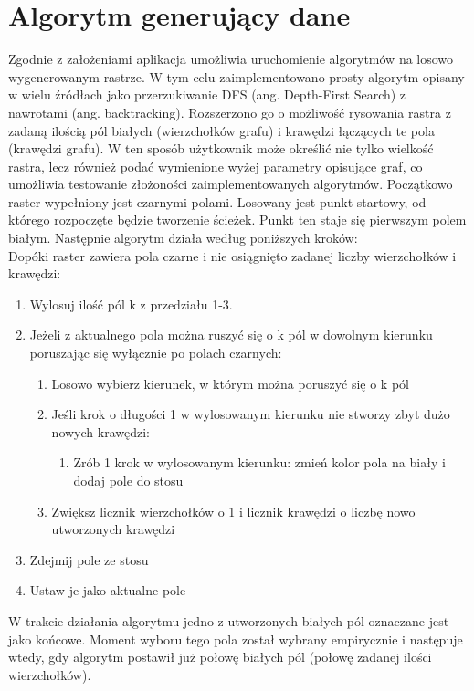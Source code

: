 \documentclass[11pt,a4paper]{article}
\begin{document}
\section{Algorytm generujący dane}
Zgodnie z założeniami aplikacja umożliwia uruchomienie algorytmów na losowo wygenerowanym
rastrze. W tym celu zaimplementowano prosty algorytm opisany w wielu źródłach jako
przerzukiwanie DFS (ang. Depth-First Search) z nawrotami (ang. backtracking). Rozszerzono
go o możliwość rysowania rastra z zadaną ilością pól białych (wierzchołków grafu) i krawędzi
łączących te pola (krawędzi grafu). W ten sposób użytkownik może określić nie tylko wielkość
rastra, lecz również podać wymienione wyżej parametry opisujące graf, co umożliwia testowanie
złożoności zaimplementowanych algorytmów.
Początkowo raster wypełniony jest czarnymi polami. Losowany jest punkt startowy, od którego 
rozpoczęte będzie tworzenie ścieżek. Punkt ten staje się pierwszym polem białym.
Następnie algorytm działa według poniższych kroków:\\

Dopóki raster zawiera pola czarne i nie osiągnięto zadanej liczby wierzchołków i krawędzi:
\begin{enumerate}
\item Wylosuj ilość pól k z przedziału 1-3.
\item Jeżeli z aktualnego pola można ruszyć się o k pól w dowolnym kierunku poruszając się wyłącznie po polach czarnych:
	\begin{enumerate}[label*=\arabic*.]
	\item Losowo wybierz kierunek, w którym można poruszyć się o k pól
	\item Jeśli krok o długości 1 w wylosowanym kierunku nie stworzy zbyt dużo nowych krawędzi:
		\begin{enumerate}[label*=\arabic*.]
		\item Zrób 1 krok w wylosowanym kierunku: zmień kolor pola na biały i dodaj pole do stosu
		\end{enumerate}
	\item Zwiększ licznik wierzchołków o 1 i licznik krawędzi o liczbę nowo utworzonych krawędzi
	\end{enumerate}
\item Zdejmij pole ze stosu
\item Ustaw je jako aktualne pole
\end{enumerate}
W trakcie działania algorytmu jedno z utworzonych białych pól oznaczane jest jako końcowe.
Moment wyboru tego pola został wybrany empirycznie i następuje wtedy, gdy
algorytm postawił już połowę białych pól (połowę zadanej ilości wierzchołków).
\end{document}
